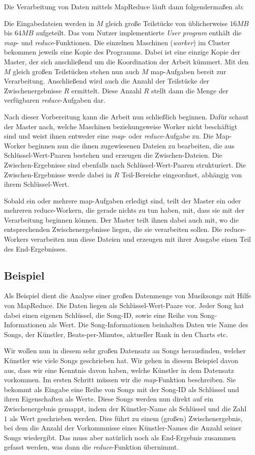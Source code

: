 Die Verarbeitung von Daten mittels MapReduce läuft dann folgendermaßen ab:

Die Eingabedateien werden in $M$ gleich große Teilstücke von üblicherweise $16MB$ bis $64MB$
aufgeteilt. Das vom Nutzer implementierte \textit{User program} enthält die \textit{map}- und 
\textit{reduce}-Funktionen. Die einzelnen Maschinen (\textit{worker}) im Cluster bekommen jeweils
eine Kopie des Programms. Dabei ist eine einzige Kopie der Master, der sich anschließend
um die Koordination der Arbeit kümmert. Mit den $M$ gleich großen Teilstücken stehen nun
auch $M $ map-Aufgaben bereit zur Verarbeitung. Anschließend wird auch die Anzahl der Teilstücke
der Zwischenergebnisse $R$ ermittelt. Diese Anzahl $R$ stellt dann die Menge der verfügbaren
\textit{reduce}-Aufgaben dar.

Nach dieser Vorbereitung kann die Arbeit nun schließlich beginnen. Dafür schaut der Master nach,
welche Maschinen beziehungsweise Worker nicht beschäftigt sind und weist ihnen entweder eine \textit{map}- oder \textit{reduce}-Aufgabe zu. Die Map-Worker beginnen nun
die ihnen zugewiesenen Dateien zu bearbeiten, die aus Schlüssel-Wert-Paaren bestehen und
erzeugen die Zwischen-Dateien. Die Zwischen-Ergebnisse sind ebenfalls nach Schlüssel-Wert-Paaren
strukturiert. Die Zwischen-Ergebnisse werde dabei in $R$ Teil-Bereiche eingeordnet, abhängig
von ihrem Schlüssel-Wert.

Sobald ein oder mehrere map-Aufgaben erledigt sind, teilt der Master ein oder mehreren 
reduce-Workern, die gerade nichts zu tun haben, mit, dass sie mit der Verarbeitung beginnen können. Der Master teilt ihnen dabei auch mit, wo die entsprechenden Zwischenergebnisse liegen,
die sie verarbeiten sollen. Die reduce-Workers verarbeiten nun diese Dateien und erzeugen
mit ihrer Ausgabe einen Teil des End-Ergebnisses.


\subsection{Beispiel}
Als Beispiel dient die Analyse einer großen Datenmenge von Musiksongs mit Hilfe von MapReduce. Die Daten liegen als
Schlüssel-Wert-Paare vor. Jeder Song hat dabei einen eigenen Schlüssel, die Song-ID, sowie eine Reihe von Song-Informationen als Wert.
Die Song-Informationen beinhalten Daten wie Name des Songs, der Künstler, Beats-per-Minutes, aktueller Rank in den Charts etc.

Wir wollen nun in diesem sehr großen Datensatz an Songs herausfinden, welcher Künstler wie viele Songs geschrieben hat. Wir gehen in diesem Beispiel davon aus, dass wir eine Kenntnis davon haben, welche Künstler in  dem Datensatz vorkommen.
Im ersten Schritt müssen wir die \textit{map}-Funktion beschreiben. Sie bekommt als Eingabe eine Reihe von Songs mit der Song-ID
als Schlüssel und ihren Eigenschaften als Werte. Diese Songs werden nun direkt auf ein Zwischenergebnis gemappt, indem der
Künstler-Name als Schlüssel und die Zahl $1$ als Wert geschrieben werden. Dies führt zu einem (großen) Zwischenergebnis,
bei dem die Anzahl der Vorkommnisse eines Künstler-Names die Anzahl seiner Songs wiedergibt. Das muss aber
natürlich noch als End-Ergebnis zusammen gefasst werden, was dann die \textit{reduce}-Funktion übernimmt. 

